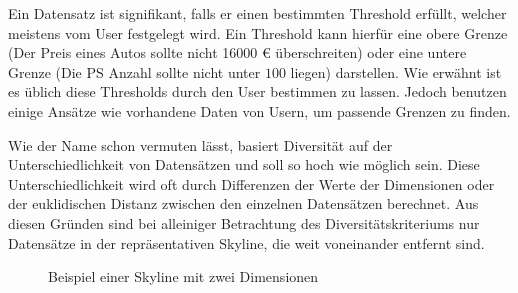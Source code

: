 {Ein Datensatz ist signifikant, falls er einen bestimmten Threshold erfüllt, welcher meistens vom User festgelegt wird. Ein Threshold kann hierfür eine obere Grenze (Der Preis eines Autos sollte nicht 16000 \euro{} überschreiten) oder eine untere Grenze (Die PS Anzahl sollte nicht unter $100$ liegen) darstellen. 
Wie erwähnt ist es üblich diese Thresholds durch den User bestimmen zu lassen. Jedoch benutzen einige Ansätze wie \cite{36988} vorhandene Daten von Usern, um passende Grenzen zu finden.

Wie der Name schon vermuten lässt, basiert Diversität auf der Unterschiedlichkeit von Datensätzen und soll so hoch wie möglich sein. Diese Unterschiedlichkeit wird oft durch Differenzen der Werte der Dimensionen oder der euklidischen Distanz zwischen den einzelnen Datensätzen berechnet. 
Aus diesen Gründen sind bei alleiniger Betrachtung des Diversitätskriteriums nur Datensätze in der repräsentativen Skyline, die weit voneinander entfernt sind. 

\begin{figure}[H]
	\centering
	\caption{Beispiel einer Skyline mit zwei Dimensionen}
	\label{img:diversitaetExample}
\end{figure}

}
